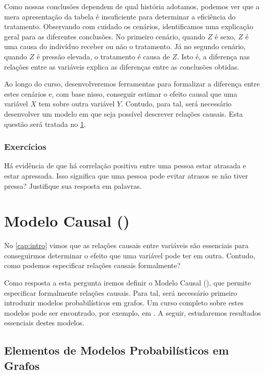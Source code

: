 Como nossas conclusões dependem de qual história adotamos,
podemos ver que a mera apresentação da tabela é
insuficiente para determinar a eficiência do tratamento.
Observando com cuidado os cenários,
identificamos uma explicação geral para
as diferentes conclusões.
No primeiro cenário, quando $Z$ é sexo,
$Z$ é uma causa do indivíduo receber ou não o tratamento.
Já no segundo cenário, quando $Z$ é pressão elevada,
o tratamento é causa de $Z$. Isto é,
a diferença nas relações entre as variáveis
explica as diferenças entre as conclusões obtidas.

Ao longo do curso, desenvolveremos ferramentas para
formalizar a diferença entre estes cenários e, com base nisso,
conseguir estimar o efeito causal que uma variável $X$ tem sobre outra variável $Y$.
Contudo, para tal, será necessário desenvolver
um modelo em que seja possível descrever relações causais.
Esta questão será tratada no \cref{cap:dag}.

\subsection{Exercícios}

\begin{exercise}
 Há evidência de que há correlação positiva entre
 uma pessoa estar atrasada e estar apressada.
 Isso significa que uma pessoa pode evitar atrasos
 se não tiver pressa? 
 Justifique sua resposta em palavras.
\end{exercise}

\chapter{Modelo Causal (\CM)}
\label{cap:dag}

No \cref{cap:intro} vimos que 
as relações causais entre variáveis são
essenciais para conseguirmos determinar
o efeito que uma variável pode ter em outra.
Contudo, como podemos especificar
relações causais formalmente?

Como resposta a esta pergunta iremos
definir o Modelo Causal (\CM),
que permite especificar formalmente relações causais.
Para tal, será necessário primeiro introduzir
modelos probabilísticos em grafos.
Um curso completo sobre estes modelos 
pode ser encontrado, por exemplo,
em \citet{Maua2022}.
A seguir, estudaremos resultados
essenciais destes modelos.

\section{Elementos de Modelos Probabilísticos em Grafos}
\label{sec:dag}

